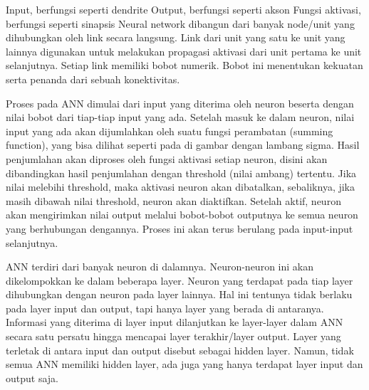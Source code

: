 Input, berfungsi seperti dendrite
Output, berfungsi seperti akson
Fungsi aktivasi, berfungsi seperti sinapsis
Neural network dibangun dari banyak node/unit yang dihubungkan oleh link secara langsung. Link dari unit yang satu ke unit yang lainnya digunakan untuk melakukan propagasi aktivasi dari unit pertama ke unit selanjutnya. Setiap link memiliki bobot numerik. Bobot ini menentukan kekuatan serta penanda dari sebuah konektivitas.

Proses pada ANN dimulai dari input yang diterima oleh neuron beserta dengan nilai bobot dari tiap-tiap input yang ada. Setelah masuk ke dalam neuron, nilai input yang ada akan dijumlahkan oleh suatu fungsi perambatan (summing function), yang bisa dilihat seperti pada di gambar dengan lambang sigma. Hasil penjumlahan akan diproses oleh fungsi aktivasi setiap neuron, disini akan dibandingkan hasil penjumlahan dengan threshold (nilai ambang) tertentu. Jika nilai melebihi threshold, maka aktivasi neuron akan dibatalkan, sebaliknya, jika masih dibawah nilai threshold, neuron akan diaktifkan. Setelah aktif, neuron akan mengirimkan nilai output melalui bobot-bobot outputnya ke semua neuron yang berhubungan dengannya. Proses ini akan terus berulang pada input-input selanjutnya.

ANN terdiri dari banyak neuron di dalamnya. Neuron-neuron ini akan dikelompokkan ke dalam beberapa layer. Neuron yang terdapat pada tiap layer dihubungkan dengan neuron pada layer lainnya. Hal ini tentunya tidak berlaku pada layer input dan output, tapi hanya layer yang berada di antaranya. Informasi yang diterima di layer input dilanjutkan ke layer-layer dalam ANN secara satu persatu hingga mencapai layer terakhir/layer output. Layer yang terletak di antara input dan output disebut sebagai hidden layer. Namun, tidak semua ANN memiliki hidden layer, ada juga yang hanya terdapat layer input dan output saja.

